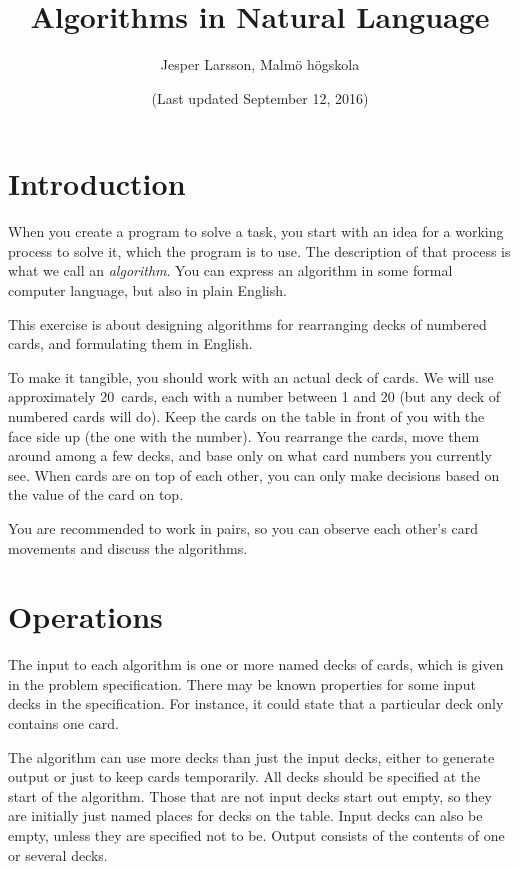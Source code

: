 \documentclass[a4paper,twoside]{tufte-handout}
\title{Algorithms in Natural Language}
\author{Jesper Larsson, Malmö högskola}
\date{(Last updated September 12, 2016)}
\begin{document}
\maketitle

\section{Introduction}\label{sec-intro}

When you create a program to solve a task, you start with an idea for
a working process to solve it, which the program is to use. The
description of that process is what we call an \emph{algorithm}. You
can express an algorithm in some formal computer language, but also in
plain English.

This exercise is about designing algorithms for rearranging decks of
numbered cards, and formulating them in English.

To make it tangible, you should work with an actual deck of cards. We
will use approximately 20~cards, each with a number between 1 and 20
(but any deck of numbered cards will do). Keep the cards on the table
in front of you with the face side up (the one with the number). You
rearrange the cards, move them around among a few decks, and base
only on what card numbers you currently see. When
cards are on top of each other, you can only make decisions based on
the value of the card on top.

You are recommended to work in pairs, so you can observe each
other's card movements and discuss the algorithms.

\section{Operations}\label{sec-ops}

The input to each algorithm is one or more named decks of cards, which
is given in the problem specification. There may be known properties
for some input decks in the specification. For instance, it could
state that a particular deck only contains one card.

The algorithm can use more decks than just the input decks, either to
generate output or just to keep cards temporarily. All decks should be
specified at the start of the algorithm. Those that are not input
decks start out empty, so they are initially just named places for
decks on the table. Input decks can also be empty, unless they are specified
not to be. Output consists of the contents of one or several decks.
\end{document}
